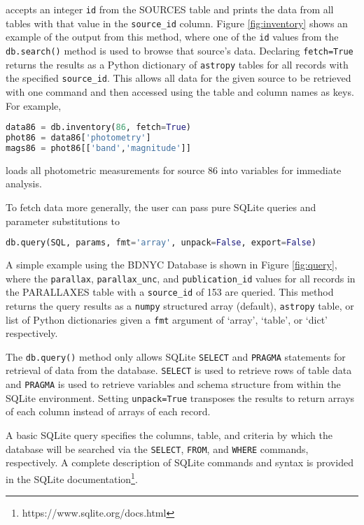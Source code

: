 \documentclass[iop,revtex4,natbib209]{emulateapj}
\begin{document}
accepts an integer \texttt{id} from the SOURCES table and prints the data from all tables with that value in the \texttt{source\_id} column. Figure \ref{fig:inventory} shows an example of the output from this method, where one of the \texttt{id} values from the \texttt{db.search()} method is used to browse that source's data. Declaring \texttt{fetch=True} returns the results as a Python dictionary of \texttt{astropy} tables for all records with the specified \texttt{source\_id}. This allows all data for the given source to be retrieved with one command and then accessed using the table and column names as keys. For example, 

\begin{lstlisting}[language=Python]
data86 = db.inventory(86, fetch=True)
phot86 = data86['photometry']
mags86 = phot86[['band','magnitude']]
\end{lstlisting}

loads all photometric measurements for source 86 into variables for immediate analysis.

To fetch data more generally, the user can pass pure SQLite queries and parameter substitutions to 

\begin{lstlisting}[language=Python]
db.query(SQL, params, fmt='array', unpack=False, export=False)
\end{lstlisting}

A simple example using the BDNYC Database is shown in Figure \ref{fig:query}, where the \texttt{parallax}, \texttt{parallax\_unc}, and \texttt{publication\_id} values for all records in the PARALLAXES table with a \texttt{source\_id} of 153 are queried. This method returns the query results as a \texttt{numpy} structured array (default), \texttt{astropy} table, or list of Python dictionaries given a \texttt{fmt} argument of `array', `table', or `dict' respectively. 

The \texttt{db.query()} method only allows SQLite \texttt{SELECT} and \texttt{PRAGMA} statements for retrieval of data from the database. \texttt{SELECT} is used to retrieve rows of table data and \texttt{PRAGMA} is used to retrieve variables and schema structure from within the SQLite environment. Setting \texttt{unpack=True} transposes the results to return arrays of each column instead of arrays of each record. 

A basic SQLite query specifies the columns, table, and criteria by which the database will be searched via the \texttt{SELECT}, \texttt{FROM}, and \texttt{WHERE} commands, respectively. A complete description of SQLite commands and syntax is provided in the SQLite documentation\footnote{https://www.sqlite.org/docs.html}.
\end{document}

